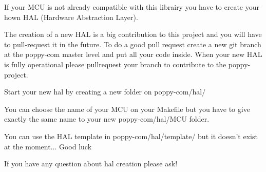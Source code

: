 If your M\-C\-U is not already compatible with this librairy you have to create your hown H\-A\-L (Hardware Abstraction Layer).

The creation of a new H\-A\-L is a big contribution to this project and you will have to pull-\/request it in the future. To do a good pull request create a new git branch at the poppy-\/com master level and put all your code inside. When your new H\-A\-L is fully operational please pullrequest your branch to contribute to the poppy-\/project.

Start your new hal by creating a new folder on poppy-\/com/hal/

You can choose the name of your M\-C\-U on your Makefile but you have to give exactly the same name to your new poppy-\/com/hal/\-M\-C\-U folder.

You can use the H\-A\-L template in poppy-\/com/hal/template/ but it doesn't exist at the moment... Good luck

If you have any question about hal creation please ask! 